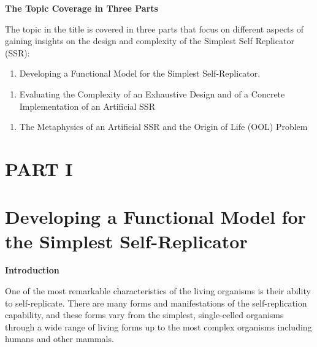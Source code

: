 \bigskip

{\bfseries\color[rgb]{0.21176471,0.37254903,0.5686275}
The Topic Coverage in Three Parts}


\bigskip

The topic in the title is covered in three parts that focus on different
aspects of gaining insights on the design and complexity of the
Simplest Self Replicator (SSR):


\bigskip

\begin{enumerate}
\item Developing a Functional Model for the Simplest Self-Replicator.
\end{enumerate}

\bigskip

\begin{enumerate}
\item Evaluating the Complexity of an Exhaustive Design and of a
Concrete Implementation of an Artificial SSR
\end{enumerate}

\bigskip

\begin{enumerate}
\item The Metaphysics of an Artificial SSR and the Origin of Life (OOL)
Problem
\end{enumerate}

\bigskip

\clearpage\section[PART I]{PART I}
\hypertarget{RefHeading3032306210128}{}\section[Developing a Functional
Model for the Simplest Self{}-Replicator]{Developing a Functional Model
for the Simplest Self-Replicator}
\hypertarget{RefHeading3034306210128}{}
\bigskip

{\bfseries
\hypertarget{RefHeading3036306210128}{}Introduction}


\bigskip

One of the most remarkable characteristics of the living organisms is
their ability to self-replicate. There are many forms and
manifestations of the self-replication capability, and these forms vary
from the simplest, single-celled organisms through a wide range of
living forms up to the most complex organisms including humans and
other mammals.


